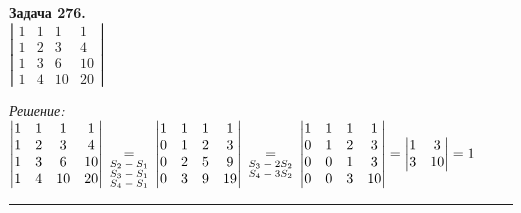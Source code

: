 \documentclass[a4paper, 12pt]{article}
\newenvironment{problem}[2][Задача]
{ \begin{mdframed}[backgroundcolor=gray!10] \textbf{#1 #2.} \\}
	{  \end{mdframed}}
\newenvironment{solution}
{\textit{Решение:}\vspace{.1cm}\\}
{\vspace{.1cm}\noindent\rule{7in}{1.5pt}}
\begin{document}
\begin{problem}{276}
$\left| \begin{array}{rrrr}1 & 1 & 1 & 1 \\ 1 & 2 & 3 & 4 \\ 1 & 3 & 6 & 10 \\ 1 & 4 & 10 & 20 \end{array} \right|$\\
\end{problem}
\begin{solution}
$
\begin{vmatrix}
	1 & 1 & 1 & 1 \\ 
	1 & 2 & 3 & 4 \\ 
	1 & 3 & 6 & 10 \\ 
	1 & 4 & 10 & 20\\
\end{vmatrix} \:
\underset{\begin{subarray}{l}\text{$S_2-S_1$}\\
		\text{$S_3-S_1$}\\
		\text{$S_4-S_1$}\end{subarray}}{=} \:
\begin{vmatrix}
	1 & 1 & 1 & 1\\
	0 & 1 & 2 & 3\\
	0 & 2 & 5 & 9\\
	0 & 3 & 9 & 19\\
\end{vmatrix} \:
\underset{\begin{subarray}{l}\text{$S_3-2S_2$}\\
		\text{$S_4-3S_2$}\\\end{subarray}}{=} \:
\begin{vmatrix}
	1 & 1 & 1 & 1\\
	0 & 1 & 2 & 3\\
	0 & 0 & 1 & 3\\
	0 & 0 & 3 & 10\\
\end{vmatrix}=
\begin{vmatrix}
	1 & 3\\
	3 & 10\\
\end{vmatrix}=1
$\\

\end{solution} 
\end{document}
